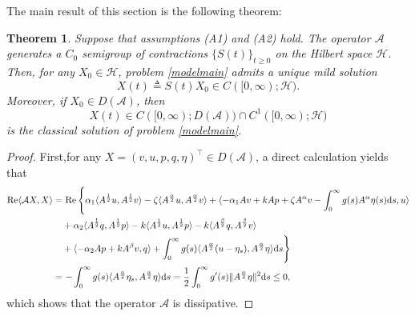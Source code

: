 \documentclass[12pt,reqno]{article}
\newtheorem{theorem}{Theorem}[section] %
\begin{document}
	The main result of this section is the following theorem:
	\begin{theorem}\label{thmwell}
		Suppose that assumptions (A1) and (A2) hold.
		The operator $\mathcal{A}$ generates a $C_0$ semigroup of contractions $\{S(t)\}_{t\geq0}$ on the Hilbert space $\mathcal{H}$.
		Then, for any $X_0\in\mathcal{H}$, problem \eqref{modelmain} admits a unique mild solution
		\[
		X(t)\triangleq S(t)X_0\in C([0,\infty);\mathcal{H}).
		\]
		Moreover, if $X_0\in D(\mathcal{A})$, then
		\[
		X(t)\in C([0,\infty); D(\mathcal{A})) \cap C^1([0,\infty); \mathcal{H})
		\]
		is the classical solution of problem \eqref{modelmain}.
	\end{theorem}
	
	\begin{proof}
		First,for any $X = (v, u, p, q, \eta)^\top \in {D}(\mathcal{A})$, a direct calculation yields that
		\begin{align}\label{dissipative}
			\operatorname{Re}\langle \mathcal{A}X, X \rangle
			&= \operatorname{Re}\Bigg\{ \alpha_1 \langle A^{\frac{1}{2}}u, A^{\frac{1}{2}}v \rangle - \zeta \langle A^{\frac{\alpha}{2}}u, A^{\frac{\alpha}{2}}v \rangle+ \langle -\alpha_1 A v + k A p + \zeta A^\alpha v - \int_0^\infty g(s)A^\alpha \eta(s)\mathrm{d}s, u \rangle \notag\\
			&\quad + \alpha_2 \langle A^{\frac{1}{2}}q, A^{\frac{1}{2}}p \rangle-k\langle A^{\frac{1}{2}} u, A^{\frac{1}{2}} p\rangle
			-k\langle A^{\frac{\beta}{2}} q, A^{\frac{\beta}{2}} v\rangle\notag\\
			&\quad + \langle -\alpha_2 A p + k A^\beta v, q \rangle  + \int_0^\infty g(s)\langle A^{\frac{\alpha}{2}}(u - \eta_s), A^{\frac{\alpha}{2}}\eta \rangle \mathrm{d}s \Bigg\} \notag\\
			&= -\int_0^\infty g(s)\langle A^{\frac{\alpha}{2}}\eta_s, A^{\frac{\alpha}{2}}\eta \rangle \mathrm{d}s= \frac{1}{2}\int_0^\infty g'(s)\|A^{\frac{\alpha}{2}}\eta\|^2 \mathrm{d}s \le 0,		
		\end{align}
		which shows that the operator $\mathcal{A}$ is dissipative.
		

\end{proof}
\end{document}
